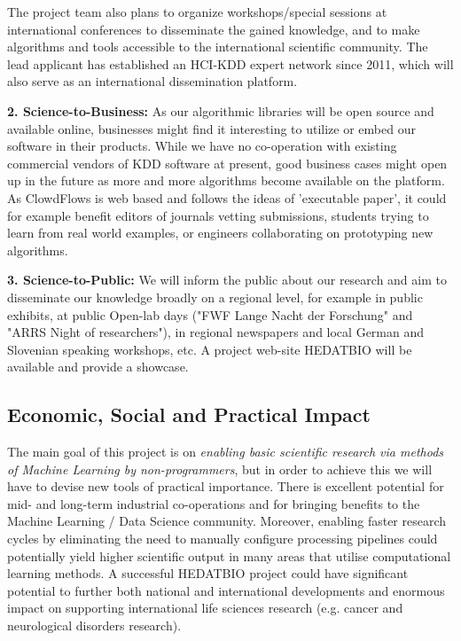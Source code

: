 \documentclass[a4paper,11pt]{article}
\begin{document}
The project team also plans to organize workshops/special sessions at international conferences to disseminate the gained knowledge, and to make algorithms and tools accessible to the international scientific community. The lead applicant has established an HCI-KDD expert network since 2011, which will also serve as an international dissemination platform.

\textbf{2. Science-to-Business:} As our algorithmic libraries will be open source and available online, businesses might find it interesting to utilize or embed our software in their products. While we have no co-operation with existing commercial vendors of KDD software at present, good business cases might open up in the future as more and more algorithms become available on the platform. As ClowdFlows is web based and follows the ideas of 'executable paper', it could for example benefit editors of journals vetting submissions, students trying to learn from real world examples, or engineers collaborating on prototyping new algorithms.


\textbf{3. Science-to-Public:} We will inform the public about our research and aim to disseminate our knowledge broadly on a regional level, for example in public exhibits, at public Open-lab days ("FWF Lange Nacht der Forschung" and "ARRS Night of researchers"), in regional newspapers and local German and Slovenian speaking workshops, etc. A project web-site HEDATBIO will be available and provide a showcase.

\subsection{Economic, Social and Practical Impact} 

The main goal of this project is on \emph{enabling basic scientific research via methods of Machine Learning by non-programmers}, but in order to achieve this we will have to devise new tools of practical importance. There is  excellent potential for mid- and long-term industrial co-operations and for bringing benefits to the Machine Learning / Data Science community. Moreover, enabling faster research cycles by eliminating the need to manually configure processing pipelines could potentially yield higher scientific output in many areas that utilise computational learning methods. A successful HEDATBIO project could have significant potential to further both national and international developments and enormous impact on supporting international life sciences research (e.g. cancer and neurological disorders research).
\end{document}
